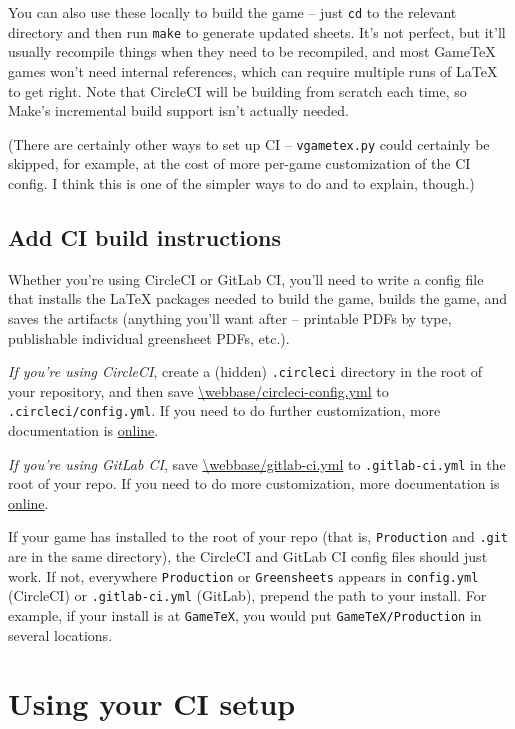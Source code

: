 \documentclass[green]{testgame}
\begin{document}
You can also use these locally to build the game -- just \texttt{cd} to the relevant directory and then run \texttt{make} to generate updated sheets. It's not perfect, but it'll usually recompile things when they need to be recompiled, and most GameTeX games won't need internal references, which can require multiple runs of \LaTeX{} to get right. Note that CircleCI will be building from scratch each time, so Make's incremental build support isn't actually needed.

(There are certainly other ways to set up CI -- \texttt{vgametex.py} could certainly be skipped, for example, at the cost of more per-game customization of the CI config. I think this is one of the simpler ways to do and to explain, though.)

\subsection{Add CI build instructions}

Whether you're using CircleCI or GitLab CI, you'll need to write a config file that installs the LaTeX packages needed to build the game, builds the game, and saves the artifacts (anything you'll want after -- printable PDFs by type, publishable individual greensheet PDFs, etc.).

\emph{If you're using CircleCI}, create a (hidden) \texttt{.circleci} directory in the root of your repository, and then save \url{\webbase/circleci-config.yml} to \texttt{.circleci/config.yml}. If you need to do further customization, more documentation is \href{https://circleci.com/docs/2.0/configuration-reference/}{online}.

\emph{If you're using GitLab CI}, save \url{\webbase/gitlab-ci.yml} to \texttt{.gitlab-ci.yml} in the root of your repo. If you need to do more customization, more documentation is \href{https://docs.gitlab.com/ee/ci/quick_start/README.html}{online}.

If your game has \GameTeX{} installed to the root of your repo (that is, \texttt{Production} and \texttt{.git} are in the same directory), the CircleCI and GitLab CI config files should just work. If not, everywhere \texttt{Production} or \texttt{Greensheets} appears in \texttt{config.yml} (CircleCI) or \texttt{.gitlab-ci.yml} (GitLab), prepend the path to your \GameTeX{} install. For example, if your \GameTeX{} install is at \texttt{GameTeX}, you would put \texttt{GameTeX/Production} in several locations.


\section{Using your CI setup}
\end{document}
